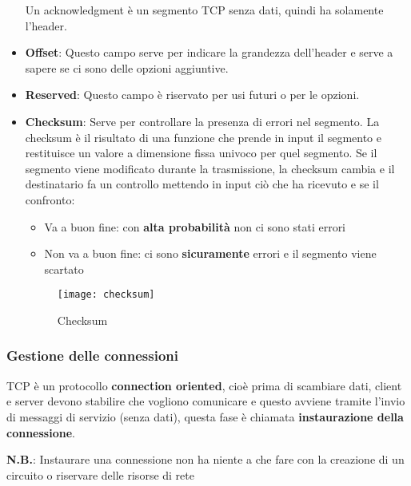 \documentclass[a4paper]{article}
\begin{document}
\begin{itemize}
    \vspace{1em}
    \noindent
    Un acknowledgment è un segmento TCP senza dati, quindi ha solamente l'header.

  \item \textbf{Offset}: Questo campo serve per indicare la grandezza dell'header e
    serve a sapere se ci sono delle opzioni aggiuntive.

  \item \textbf{Reserved}: Questo campo è riservato per usi futuri o per le opzioni.

  \item \textbf{Checksum}: Serve per controllare la presenza di errori nel segmento.
    La checksum è il risultato di una funzione che prende in input il segmento e restituisce
    un valore a dimensione fissa univoco per quel segmento. Se il segmento viene modificato
    durante la trasmissione, la checksum cambia e il destinatario fa un controllo
    mettendo in input ciò che ha ricevuto e se il confronto:
    \begin{itemize}
      \item Va a buon fine: con \textbf{alta probabilità} non ci sono stati errori
      \item Non va a buon fine: ci sono \textbf{sicuramente} errori e il segmento
        viene scartato
    \end{itemize}
    \begin{figure}[H]
      \centering
      \texttt{[image: checksum]}
      \caption{Checksum}
    \end{figure}
\end{itemize}

\subsubsection{Gestione delle connessioni}
TCP è un protocollo \textbf{connection oriented}, cioè prima di scambiare dati, client
e server devono stabilire che vogliono comunicare e questo avviene tramite l'invio di
messaggi di servizio (senza dati), questa fase è chiamata \textbf{instaurazione della 
connessione}.

\vspace{1em}
\noindent
\textbf{N.B.}:
Instaurare una connessione non ha niente a che fare con la creazione di un circuito
o riservare delle risorse di rete
\end{document}
